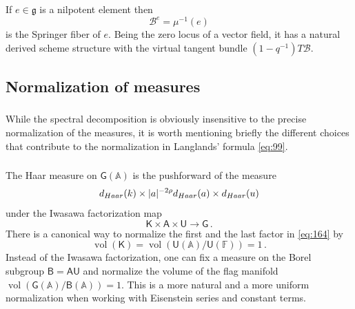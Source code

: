 \documentclass[14pt]{extarticle}
\newcommand{\A}{\mathbb{A}}
\newcommand{\F}{\mathbb{F}}
\newcommand{\bA}{\mathsf{A}}
\newcommand{\bG}{\mathsf{G}}
\newcommand{\bU}{\mathsf{U}}
\newcommand{\bB}{\mathsf{B}}
\newcommand{\bK}{\mathsf{K}}
\newcommand{\cB}{\mathscr{B}}
\newcommand{\fg}{\mathfrak{g}}
\DeclareMathOperator{\vol}{vol}
\theoremstyle{definition}
\begin{document}
\subsubsection{}\label{s_App_Spring}

If $e\in \fg$ is a nilpotent element then
%
\begin{equation}
\cB^e = \mu^{-1}(e)\label{Spri}
\end{equation}
%
is the Springer fiber of $e$. Being the zero locus of a vector field,
it has a natural derived scheme structure with the
virtual tangent bundle $(1-q^{-1}) T\cB$. 

\subsection{Normalization of measures}\label{s_pT3}


\subsubsection{}

While the spectral decomposition is obviously insensitive to the
precise normalization of the measures, it is worth mentioning
briefly the different choices that contribute to the normalization in 
Langlands' formula \eqref{eq:99}.

\subsubsection{}

The Haar measure on $\bG(\A)$ is the pushforward
of the measure
%
\begin{equation}
d_{\textup{Haar}}(k) \times |a|^{-2\rho} d_{\textup{Haar}}(a)
\times d_{\textup{Haar}}(u)\label{eq:164}
\end{equation}
%
under the Iwasawa factorization map 
\[
  \bK \times \bA \times \bU  \to \bG \,. 
\]
There is a canonical way to normalize
the first and the last factor in \eqref{eq:164} by 
%
\begin{equation}
\vol(\bK) = \vol(\bU(\A)/\bU(\F)) = 1 \,. \label{eq:165}
\end{equation}
%
Instead of the Iwasawa factorization, one can fix a measure
on the Borel subgroup $\bB = \bA \bU$ and normalize the volume
of the flag manifold 
$\vol(\bG(\A)/\bB(\A)) =1$. This is a more natural and a more
uniform normalization when working with Eisenstein series and
constant terms.
\end{document}
